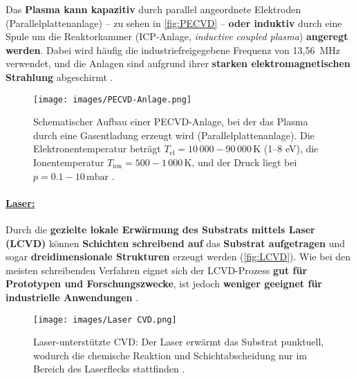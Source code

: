 \documentclass{article} %
\begin{document}
\vspace{0.0em}

Das \textbf{Plasma kann kapazitiv} durch parallel angeordnete Elektroden (Parallelplattenanlage) -- zu sehen in \autoref{fig:PECVD} -- \textbf{oder induktiv} 
durch eine Spule um die Reaktorkammer (ICP-Anlage, \textit{inductive coupled plasma}) \textbf{angeregt werden}. Dabei wird häufig die industriefreigegebene 
Frequenz von 13,56~MHz verwendet, und die Anlagen sind aufgrund ihrer \textbf{starken elektromagnetischen Strahlung} abgeschirmt \cite{keplinger2024CVD}.

\begin{figure}[htb!]
    \centering
    \texttt{[image: images/PECVD-Anlage.png]} %
    \captionsetup{labelfont=bf} %
    \caption{Schematischer Aufbau einer PECVD-Anlage, bei der das Plasma durch eine Gasentladung erzeugt wird (Parallelplattenanlage). Die 
    Elektronentemperatur beträgt $T_\mathrm{el} = 10\,000{-}90\,000 \, \mathrm{K}$ (1–8 eV), die Ionentemperatur $T_\mathrm{ion} = 500{-}1\,000 \, \mathrm{K}$, 
    und der Druck liegt bei $p = 0.1{-}10 \, \mathrm{mbar}$ \cite{keplinger2024CVD}.}
    \label{fig:PECVD}
\end{figure}

\vspace{0.0em}
\paragraph{\uline{Laser:}} Durch die \textbf{gezielte lokale Erwärmung des Substrats mittels Laser (LCVD)} können \textbf{Schichten schreibend auf} das 
\textbf{Substrat aufgetragen} und sogar \textbf{dreidimensionale Strukturen} erzeugt werden (\autoref{fig:LCVD}). Wie bei den meisten schreibenden Verfahren eignet 
sich der LCVD-Prozess \textbf{gut für Prototypen und Forschungszwecke}, ist jedoch \textbf{weniger geeignet für industrielle Anwendungen} \cite{keplinger2024CVD}.

\begin{figure}[htb!]
    \centering
    \texttt{[image: images/Laser CVD.png]} %
    \captionsetup{labelfont=bf} %
    \caption{Laser-unterstützte CVD: Der Laser erwärmt das Substrat punktuell, wodurch die chemische Reaktion und Schichtabscheidung nur im Bereich des Laserflecks 
    stattfinden \cite{keplinger2024CVD}.}
    \label{fig:LCVD}
\end{figure}
\end{document}
